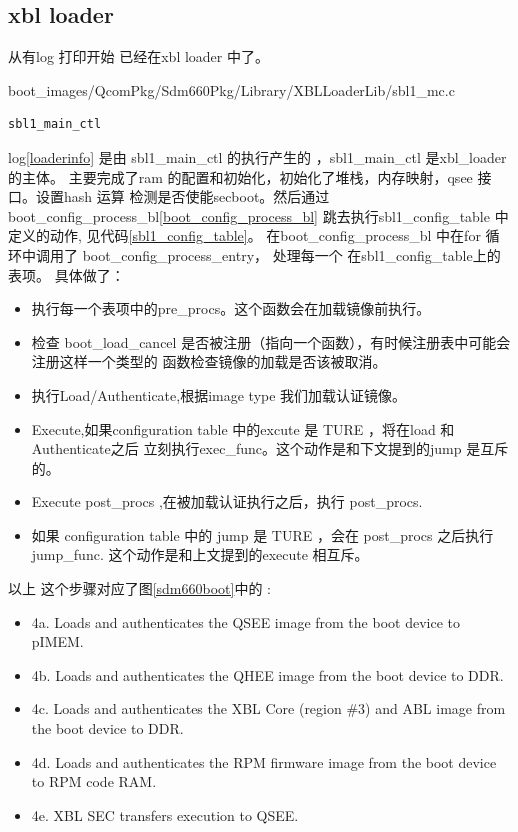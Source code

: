 \subsection{xbl loader}

从有log 打印开始 已经在xbl loader 中了。

boot\_images/QcomPkg/Sdm660Pkg/Library/XBLLoaderLib/sbl1\_mc.c
\begin{lstlisting}
sbl1_main_ctl
\end{lstlisting}

log\ref{loaderinfo} 是由 sbl1\_main\_ctl 的执行产生的 ，sbl1\_main\_ctl 是xbl\_loader 的主体。
主要完成了ram 的配置和初始化，初始化了堆栈，内存映射，qsee 接口。设置hash 运算
检测是否使能secboot。然后通过
boot\_config\_process\_bl\ref{boot_config_process_bl}
跳去执行sbl1\_config\_table 中定义的动作, 见代码\ref{sbl1_config_table}。
在boot\_config\_process\_bl 中在for 循环中调用了 boot\_config\_process\_entry， 处理每一个 在sbl1\_config\_table上的表项。
具体做了：
\begin{itemize}
 \item 执行每一个表项中的pre\_procs。这个函数会在加载镜像前执行。
 \item 检查 boot\_load\_cancel 是否被注册（指向一个函数），有时候注册表中可能会注册这样一个类型的
 函数检查镜像的加载是否该被取消。
 \item 执行Load/Authenticate,根据image type 我们加载认证镜像。
 \item Execute,如果configuration table 中的excute 是 TURE ，将在load 和Authenticate之后
立刻执行exec\_func。这个动作是和下文提到的jump 是互斥的。
 \item Execute post\_procs ,在被加载认证执行之后，执行 post\_procs.
 \item 如果 configuration table 中的 jump 是 TURE ，会在 post\_procs 之后执行jump\_func.
 这个动作是和上文提到的execute 相互斥。	
 
\end{itemize}

以上 这个步骤对应了图\ref{sdm660boot}中的 :
\begin{itemize}
\item 4a. Loads and authenticates the QSEE image from the boot device to ​pIMEM​.
\item 4b. Loads and authenticates the QHEE image from the boot device to DDR.
\item 4c. Loads and authenticates the XBL Core (region \#3) and ABL image from the boot device to
DDR.
\item 4d. Loads and authenticates the RPM firmware image from the boot device to RPM code
RAM.
\item 4e. XBL SEC transfers execution to QSEE.
\end{itemize}


